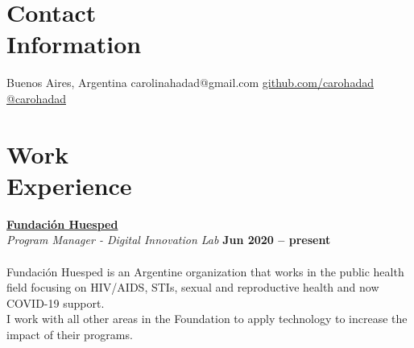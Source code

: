 \documentclass[margin,line]{resume}
\begin{document}
\begin{resume}

\section{\mysidestyle Contact\\Information}

\faMapMarker \vspace{5mm} Buenos Aires, Argentina \hfill
\faEnvelope \vspace{5mm} carolinahadad@gmail.com
\faGithub \vspace{5mm} \href{https://github.com/carohadad}{github.com/carohadad} \hfill
\faTwitter \vspace{5mm} \href{https://twitter.com/carohadad}{@carohadad}

\vspace{-1.5cm}
\section{\mysidestyle Work\\Experience}


\textbf{\href{https://www.huesped.org.ar/}{Fundaci\'on Huesped}}\\\vspace{1mm}
\textsl{Program Manager - Digital Innovation Lab} \hfill \textbf{Jun 2020 -- present}\vspace{-3mm}\\\vspace{-1mm}
\\
Fundaci\'on Huesped is an Argentine organization that works in the public health field focusing on HIV/AIDS, STIs, sexual and reproductive health and now COVID-19 support.
\\
I work with all other areas in the Foundation to apply technology to increase the impact of their programs.



\end{resume}
\end{document}
